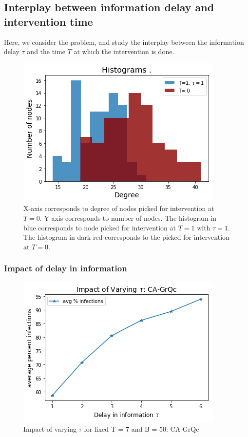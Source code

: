 \subsection{Interplay between information delay and intervention time}

Here, we consider the \probdelay{} problem, and study the interplay between the information delay $\tau$ and the time $T$ at which the intervention is done. 

\begin{figure}[!h]
    \centering
    \includegraphics[scale = 0.6]{figures/histogram.png}
    \caption{X-axis corresponds to degree of nodes picked for intervention at $T=0$. Y-axis corresponds to number of nodes. The histogram in blue corresponds to node picked for intervention at $T = 1$ with $\tau = 1$. The histogram in dark red corresponds to the picked for intervention at $T = 0$.}
    \label{fig:hist}
\end{figure}


\subsubsection{Impact of delay in information}
\begin{figure}[!h]
    \centering
    \includegraphics[scale = 0.5]{figures/varytauGrQc.png}
    \caption{Impact of varying $\tau$ for fixed T = 7 and B = 50: CA-GrQc}
    \label{fig:T7tau}
\end{figure}

